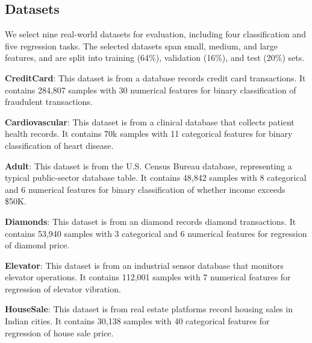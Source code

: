 \documentclass[conference]{IEEEtran}
\newcommand{\sydesi}[1]{{\color{black}#1}}
\newcommand{\syadd}[1]{{\color{black}#1}}
\newcommand{\vldb}[1]{{\color{black}#1}}
\newcommand{\syic}[1]{{\color{black}#1}}
\newcommand*{\ourmodel}{TEAL}
\begin{document}
\subsection{Datasets}
We select \syic{nine} real-world datasets for evaluation, including \syic{four} classification and \syic{five} regression tasks. \syadd{The selected datasets span small, medium, and large features}\syic{, and are split into training (64\%), validation (16\%), and test (20\%) sets.}

\noindent \textbf{CreditCard}: \vldb{This dataset is from a database records credit card transactions. It contains 284,807 samples with 30 numerical features for binary classification of fraudulent transactions.}

\noindent \textbf{Cardiovascular}: \vldb{This dataset is from a clinical database that collects patient health records. It contains 70k samples with 11 categorical features for binary classification of heart disease.}

\noindent \textbf{Adult}: \vldb{This dataset is from the U.S. Census Bureau database, representing a typical public-sector database table. It contains 48,842 samples with 8 categorical and 6 numerical features for binary classification of whether income exceeds \$50K.}

\noindent \textbf{Diamonds}: \vldb{This dataset is from an diamond records diamond transactions. It contains 53,940 samples with 3 categorical and 6 numerical features for regression of diamond price.}

\noindent \textbf{Elevator}: \vldb{This dataset is from an industrial sensor database that monitors elevator operations. It contains 112,001 samples with 7 numerical features for regression of elevator vibration.}

\noindent \textbf{HouseSale}: \vldb{This dataset is from real estate platforms record housing sales in Indian cities. It contains 30,138 samples with 40 categorical features for regression of house sale price.}
\end{document}
